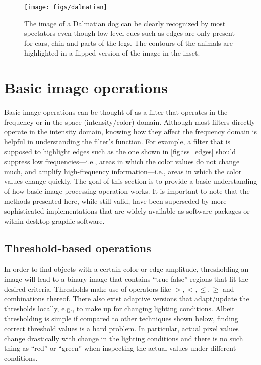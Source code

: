 \begin{figure}[!]
    \centering
    \texttt{[image: figs/dalmatian]}
    \caption{The image of a Dalmatian dog can be clearly recognized by most spectators even though low-level cues such as edges are only present for ears, chin and parts of the legs. The contours of the animals are highlighted in a flipped version of the image in the inset.
    \label{fig:dalmatian}}
\end{figure}

\section{Basic image operations}

Basic image operations can be thought of as a filter that operates in the frequency or in the space (intensity/color) domain. Although most filters directly operate in the intensity domain, knowing how they affect the frequency domain is helpful in understanding the filter's function. For example, a filter that is supposed to highlight edges such as the one shown in \cref{fig:iss_edges} should suppress low frequencies---i.e., areas in which the color values do not change much, and amplify high-frequency information---i.e., areas in which the color values change quickly. The goal of this section is to provide a basic understanding of how basic image processing operation works. It is important to note that the methods presented here, while still valid, have been superseded by more sophisticated implementations that are widely available as software packages or within desktop graphic software.

\subsection{Threshold-based operations}
In order to find objects with a certain color or edge amplitude, thresholding an image will lead to a binary image that contains ``true-false'' regions that fit the desired criteria. Thresholds make use of operators like $>,<,\leq,\geq$ and combinations thereof. There also exist adaptive versions that adapt/update the thresholds locally, e.g., to make up for changing lighting conditions.
Albeit thresholding is simple if compared to other techniques shown below, finding correct threshold values is a hard problem. In particular, actual pixel values change drastically with change in the lighting conditions and there is no such thing as ``red'' or ``green'' when inspecting the actual values under different conditions.

